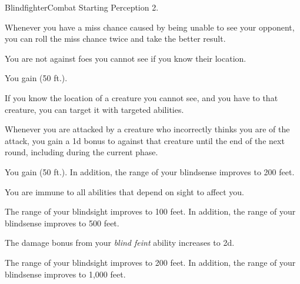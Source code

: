     \begin{feat}{Blindfighter}{Combat}
        \featpre Starting Perception 2.
        \featben
        
         Whenever you have a miss chance caused by being unable to see your opponent, you can roll the miss chance twice and take the better result.

         You are not  against foes you cannot see if you know their location.

         You gain  (50 ft.).

         If you know the location of a creature you cannot see, and you have  to that creature, you can target it with targeted abilities.

         Whenever you are attacked by a creature who incorrectly thinks you are  of the attack, you gain a \plus1d bonus to  against that creature until the end of the next round, including during the current phase.

         You gain  (50 ft.).
        In addition, the range of your blindsense improves to 200 feet. 

         You are immune to all abilities that depend on sight to affect you.

         The range of your blindsight improves to 100 feet.
        In addition, the range of your blindsense improves to 500 feet.

         The damage bonus from your \textit{blind feint} ability increases to \plus2d.

         The range of your blindsight improves to 200 feet.
        In addition, the range of your blindsense improves to 1,000 feet.
    \end{feat}

